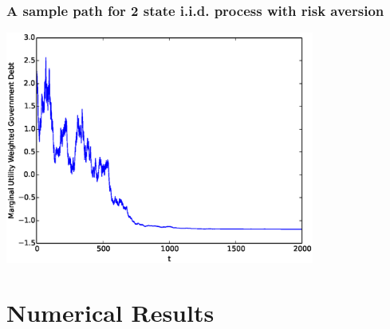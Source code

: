 \documentclass{beamer}
\begin{document}
%
%
\begin{frame}
	\frametitle{A sample path for 2 state i.i.d. process with risk aversion}
	\begin{center}
	\includegraphics[width=4in]{Images/2stateiid.eps}
	\end{center}
\end{frame}

\section{Numerical Results}
\end{document}
